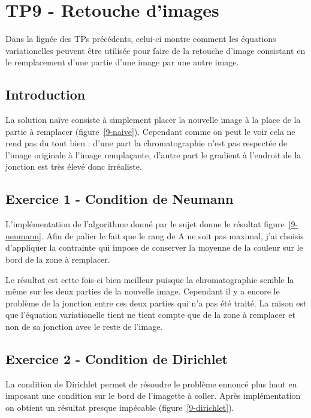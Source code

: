 \section{TP9 - Retouche d'images}
Dans la lignée des TPs précédents, celui-ci montre comment les équations variationelles peuvent être utilisée pour faire de la retouche d'image consistant en le remplacement d'une partie d'une image par une autre image.

\subsection{Introduction}
La solution naïve consiste à simplement placer la nouvelle image à la place de la partie à remplacer (figure~\ref{9-naive}). Cependant comme on peut le voir cela ne rend pas du tout bien : d'une part la chromatographie n'est pas respectée de l'image originale à l'image remplaçante, d'autre part le gradient à l'endroit de la jonction est très élevé donc irréaliste.

\begin{figure}
\end{figure}

\subsection{Exercice 1 - Condition de Neumann}
L'implémentation de l'algorithme donné par le sujet donne le résultat figure~\ref{9-neumann}. Afin de palier le fait que le rang de A ne soit pas maximal, j'ai choisis d'appliquer la contrainte qui impose de conserver la moyenne de la couleur sur le bord de la zone à remplacer.

\begin{figure}
\end{figure}

Le résultat est cette fois-ci bien meilleur puisque la chromatographie semble la même sur les deux parties de la nouvelle image. Cependant il y a encore le problème de la jonction entre ces deux parties qui n'a pas été traité. La raison est que l'équation variationelle tient ne tient compte que de la zone à remplacer et non de sa jonction avec le reste de l'image.

\subsection{Exercice 2 - Condition de Dirichlet}
La condition de Dirichlet permet de résoudre le problème ennoncé plus haut en imposant une condition sur le bord de l'imagette à coller. Après implémentation on obtient un résultat presque impécable (figure~\ref{9-dirichlet}).
